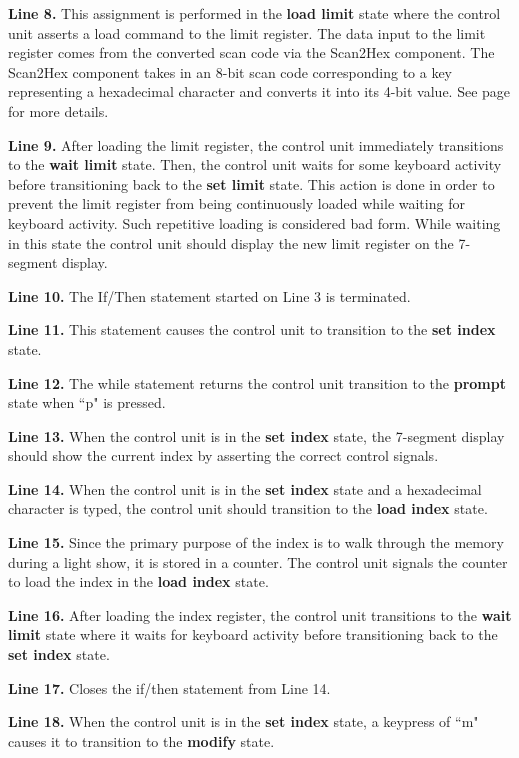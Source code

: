 {\bf Line 8.} This assignment is performed in the {\bf load limit} state where the control 
unit asserts a load command to the limit register.  The data input to the limit 
register comes from the converted scan code via the Scan2Hex component.  The Scan2Hex
component takes in an 8-bit scan code corresponding to a key representing a hexadecimal
character and converts it into its 4-bit value. See page \pageref{page:ScanDecode}
for more details.

{\bf Line 9.}  After loading the limit register, the control unit immediately transitions 
to the {\bf wait limit} state.  Then, the control unit waits for some keyboard activity 
before transitioning back to the {\bf set limit} state.  This action is done in order to prevent 
the limit register from being continuously loaded while waiting for keyboard activity.
Such repetitive loading is considered bad form.  While waiting in this state the control 
unit should display the new limit register on the 7-segment display.

{\bf Line 10.} The If/Then statement started on Line 3 is terminated.

{\bf Line 11.} This statement causes the control unit to transition to the {\bf set index}
 state.

{\bf Line 12.} The while statement returns the control unit transition to the {\bf prompt} state when 
``p" is pressed.

{\bf Line 13.} When the control unit is in the {\bf set index} state, the 7-segment display 
should show the current index by asserting the correct control signals.

{\bf Line 14.} When the control unit is in the {\bf set index} state and a hexadecimal 
character is typed, the control unit should transition to the {\bf load index} state.

{\bf Line 15.} Since the primary purpose of the index is to walk through the memory 
during a light show, it is stored in a counter.  The control unit signals the 
counter to load the index in the {\bf load index} state.

{\bf Line 16.} After loading the index register, the control unit transitions to the {\bf wait 
limit} state where it waits for keyboard activity before transitioning back 
to the {\bf set index} state.

{\bf Line 17.} Closes the if/then statement from Line 14.

{\bf Line 18.} When the control unit is in the {\bf set index} state, a keypress of ``m" 
causes it to transition to the {\bf modify} state.

